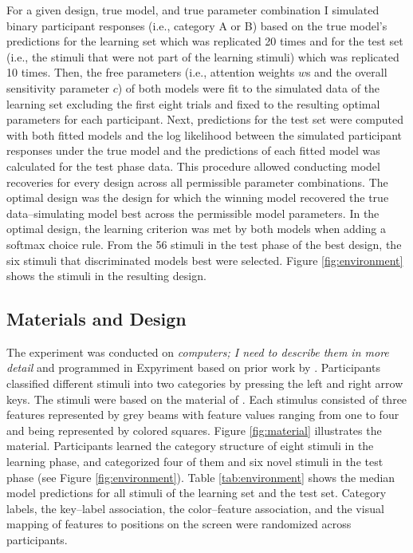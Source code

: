 \documentclass[a4paper,man,natbib]{apa6}
\begin{document}
For a given design, true model, and true parameter combination I simulated binary participant responses (i.e., category A or B) based on the true model's predictions for the learning set which was replicated 20 times and for the test set (i.e., the stimuli that were not part of the learning stimuli) which was replicated 10 times. Then, the free parameters (i.e., attention weights $w$s and the overall sensitivity parameter $c$) of both models were fit to the simulated data of the learning set excluding the first eight trials and fixed to the resulting optimal parameters for each participant. Next, predictions for the test set were computed with both fitted models and the log likelihood between the simulated participant responses under the true model and the predictions of each fitted model was calculated for the test phase data. This procedure allowed conducting model recoveries for every design across all permissible parameter combinations. The optimal design was the design for which the winning model recovered the true data--simulating model best across the permissible model parameters. In the optimal design, the learning criterion was met by both models when adding a softmax choice rule. From the 56 stimuli in the test phase of the best design, the six stimuli that discriminated models best were selected. Figure \ref{fig:environment} shows the stimuli in the resulting design.

\subsection{Materials and Design}
The experiment was conducted on \textit{computers; I need to describe them in more detail} and programmed in Expyriment \citep{krause2014expyriment} based on prior work by \cite{albrechtxxxunstacking}. Participants classified different stimuli into two categories by pressing the left and right arrow keys. The stimuli were based on the material of \cite{albrechtxxxunstacking}. Each stimulus consisted of three features represented by grey beams with feature values ranging from one to four and being represented by colored squares. Figure \ref{fig:material} illustrates the material. Participants learned the category structure of eight stimuli in the learning phase, and categorized four of them and six novel stimuli in the test phase (see Figure \ref{fig:environment}). Table \ref{tab:environment} shows the median model predictions for all stimuli of the learning set and the test set. Category labels, the key--label association, the color--feature association, and the visual mapping of features to positions on the screen were randomized across participants.
\end{document}

